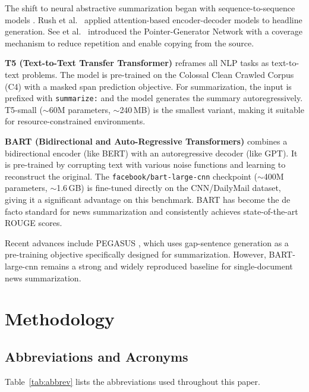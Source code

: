 \documentclass[conference]{IEEEtran}
\begin{document}
The shift to neural abstractive summarization began with
sequence-to-sequence models \cite{sutskever2014,bahdanau2015}. Rush et
al.\ \cite{rush2015} applied attention-based encoder-decoder models to
headline generation. See et al.\ \cite{see2017} introduced the
Pointer-Generator Network with a coverage mechanism to reduce repetition
and enable copying from the source.

\textbf{T5 (Text-to-Text Transfer Transformer)} \cite{raffel2020}
reframes all NLP tasks as text-to-text problems. The model is pre-trained
on the Colossal Clean Crawled Corpus (C4) with a masked span prediction
objective. For summarization, the input is prefixed with
\texttt{summarize:} and the model generates the summary autoregressively.
T5-small ($\sim$60M parameters, $\sim$240\,MB) is the smallest variant,
making it suitable for resource-constrained environments.

\textbf{BART (Bidirectional and Auto-Regressive Transformers)}
\cite{lewis2020} combines a bidirectional encoder (like BERT) with an
autoregressive decoder (like GPT). It is pre-trained by corrupting text
with various noise functions and learning to reconstruct the original. The
\texttt{facebook/bart-large-cnn} checkpoint ($\sim$400M parameters,
$\sim$1.6\,GB) is fine-tuned directly on the CNN/DailyMail dataset,
giving it a significant advantage on this benchmark. BART has become the
de facto standard for news summarization and consistently achieves
state-of-the-art ROUGE scores.

Recent advances include PEGASUS \cite{zhang2020}, which uses gap-sentence
generation as a pre-training objective specifically designed for
summarization. However, BART-large-cnn remains a strong and widely
reproduced baseline for single-document news summarization.

\section{Methodology}
\label{sec:method}

\subsection{Abbreviations and Acronyms}

Table~\ref{tab:abbrev} lists the abbreviations used throughout this paper.
\end{document}
